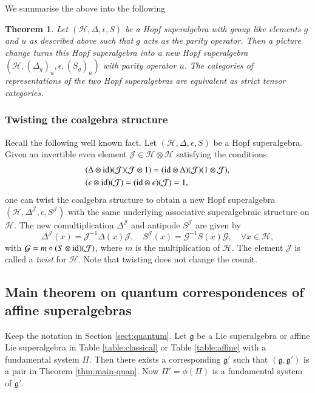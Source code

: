 \documentclass[12pt]{amsart}
\newtheorem{theorem}{Theorem}[section]
\theoremstyle{definition}
\theoremstyle{remark}
\numberwithin{equation}{section}
\begin{document}
We summarise the above into the following

\begin{theorem} \label{thm:PC} Let $({{\mathscr H}}, \Delta, \epsilon, S)$ be a Hopf superalgebra with group like elements $g$ and $u$ as described above such that $g$ acts as the parity operator.
Then a picture change turns this Hopf superalgebra into a new Hopf superalgebra
$({{\mathscr H}}, (\Delta_g)_u, \epsilon, (S_g)_u)$ with parity operator $u$. The categories of representations of the two Hopf superalgebras are equivalent as strict tensor categories.
\end{theorem}

\subsubsection{Twisting the coalgebra structure}
\setcounter{case}{0}

Recall the following well known fact. Let $({{\mathscr H}}, \Delta, \epsilon, S)$ be a Hopf superalgebra. Given an invertible even element ${{\mathcal J}}\in {{\mathscr H}}\otimes{{\mathscr H}}$ satisfying the conditions
\begin{eqnarray}\label{eq:twist}
\begin{aligned}
&(\Delta\otimes{{\rm{id}}})({{\mathcal J}})({{\mathcal J}}\otimes 1)=({{\rm{id}}}\otimes\Delta)({{\mathcal J}})(1\otimes{{\mathcal J}}), \\
&(\epsilon\otimes{{\rm{id}}})({{\mathcal J}})=({{\rm{id}}}\otimes\epsilon)({{\mathcal J}})=1,
\end{aligned}
\end{eqnarray}
one can twist the coalgebra structure to obtain a new Hopf superalgebra $({{\mathscr H}}, \Delta^{{\mathcal J}}, \epsilon, S^{{\mathcal J}})$ with the same underlying associative superalgebraic structure on ${{\mathscr H}}$.
The new comultiplication $\Delta^{{\mathcal J}}$ and antipode $S^{{\mathcal J}}$ are given by
\[
\Delta^{{\mathcal J}}(x)= {{\mathcal J}}^{-1}\Delta(x) {{\mathcal J}}, \quad S^{{\mathcal J}}(x)={{\mathcal G}}^{-1} S(x) {{\mathcal G}}, \quad \forall x\in {{\mathscr H}},
\]
with ${{\mathcal G}}=m\circ(S\otimes{{\rm{id}}})({{\mathcal J}})$, where $m$ is the multiplication of ${{\mathscr H}}$. The element ${{\mathcal J}}$ is called a {\em twist} for ${{\mathscr H}}$. Note that twisting does not change the counit.

\subsection{Main theorem on quantum correspondences of affine superalgebras}
 Keep the notation in Section \ref{sect:quantum}.
Let ${{\mathfrak g}}$ be a Lie superalgebra or affine Lie superalgebra in Table \ref{table:classical} or Table \ref{table:affine} with a fundamental system $\Pi$. 
Then there exists a corresponding ${{\mathfrak g}}'$ such that $({{\mathfrak g}}, {{\mathfrak g}}')$ is a pair in Theorem \ref{thm:main-quan}.  Now $\Pi'=\phi(\Pi)$ is a fundamental system of ${{\mathfrak g}}'$.
\end{document}
